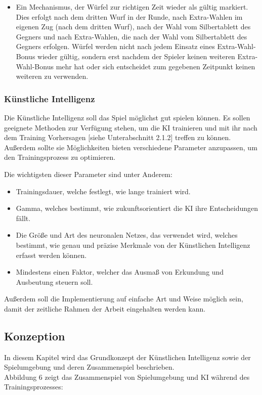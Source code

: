 \begin{itemize}
\item Ein Mechanismus, der Würfel zur richtigen Zeit wieder als gültig markiert. Dies erfolgt nach dem dritten Wurf in der Runde, nach Extra-Wahlen im eigenen Zug (nach dem dritten Wurf), nach der Wahl vom Silbertablett des Gegners und nach Extra-Wahlen, die nach der Wahl vom Silbertablett des Gegners erfolgen. Würfel werden nicht nach jedem Einsatz eines Extra-Wahl-Bonus wieder gültig, sondern erst nachdem der Spieler keinen weiteren Extra-Wahl-Bonus mehr hat oder sich entscheidet zum gegebenen Zeitpunkt keinen weiteren zu verwenden.
\end{itemize}
\subsubsection{Künstliche Intelligenz}
Die Künstliche Intelligenz soll das Spiel möglichst gut spielen können. Es sollen geeignete Methoden zur Verfügung stehen, um die KI trainieren und mit ihr nach dem Training Vorhersagen [siehe Unterabschnitt 2.1.2] treffen zu können. Außerdem sollte sie Möglichkeiten bieten verschiedene Parameter anzupassen, um den Trainingsprozess zu optimieren.

Die wichtigsten dieser Parameter sind unter Anderem:
\begin{itemize} 
\item Trainingsdauer, welche festlegt, wie lange trainiert wird.
\item Gamma, welches bestimmt, wie zukunftsorientiert die KI ihre Entscheidungen fällt. 
\item Die Größe und Art des neuronalen Netzes, das verwendet wird, welches bestimmt, wie genau und präzise Merkmale von der Künstlichen Intelligenz erfasst werden können.
\item Mindestens einen Faktor, welcher das Ausmaß von Erkundung und Ausbeutung steuern soll. 
\end{itemize}
Außerdem soll die Implementierung auf einfache Art und Weise möglich sein, damit der zeitliche Rahmen der Arbeit eingehalten werden kann.
\subsection{Konzeption}
In diesem Kapitel wird das Grundkonzept der Künstlichen Intelligenz sowie der Spielumgebung und deren Zusammenspiel beschrieben.\\

Abbildung 6 zeigt das Zusammenspiel von Spielumgebung und KI während des Trainingsprozesses:

